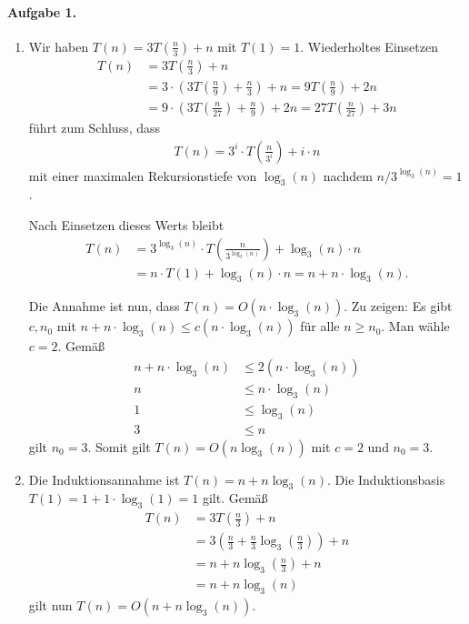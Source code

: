 \documentclass{article}
\begin{document}
\paragraph{Aufgabe 1.}

\begin{enumerate}
    \item Wir haben \(T(n) = 3T(\frac{n}{3}) + n\) mit \(T(1) = 1\). Wiederholtes Einsetzen
    \begin{align*}
        T(n) &= 3 T\left(\frac{n}{3}\right) + n \\
        &= 3 \cdot \left(3T\left(\frac{n}{9}\right) + \frac{n}{3}\right) + n =  9T\left(\frac{n}{9}\right) + 2n \\
        &= 9 \cdot \left(3T\left(\frac{n}{27}\right) + \frac{n}{9}\right) + 2n = 27T\left(\frac{n}{27}\right) + 3n
    \end{align*}
    führt zum Schluss, dass
    \begin{align*}
        T(n) = 3^i \cdot T\left(\frac{n}{3^i}\right) + i \cdot n
    \end{align*}
    mit einer maximalen Rekursionstiefe von \(\log_3(n)\) nachdem \(n / 3^{\log_3(n)} = 1\).

    Nach Einsetzen dieses Werts bleibt
    \begin{align*}
        T(n) &= 3^{\log_3(n)} \cdot T\left(\frac{n}{3^{\log_3(n)}}\right) + \log_3(n) \cdot n \\
        &= n \cdot T(1) + \log_3(n) \cdot n = n + n \cdot \log_3(n).
    \end{align*}

    Die Annahme ist nun, dass \(T(n) = O(n \cdot \log_3(n))\). Zu zeigen: Es gibt \(c, n_0\) mit \(n + n \cdot \log_3(n) \leq c(n \cdot \log_3(n))\) für alle \(n \geq n_0\). Man wähle \(c = 2\). Gemäß
    \begin{align*}
        n + n \cdot \log_3(n) &\leq 2(n \cdot \log_3(n)) \\
        n &\leq n \cdot \log_3(n) \\
        1 &\leq \log_3(n) \\
        3 &\leq n
    \end{align*}
    gilt \(n_0 = 3\). Somit gilt \(T(n) = O(n \log_3(n))\) mit $c = 2$ und $n_0 = 3$.

    \item Die Induktionsannahme ist \(T(n) = n + n\log_3(n)\). Die Induktionsbasis \(T(1) = 1 + 1 \cdot \log_3(1) = 1\) gilt. Gemäß
    \begin{align*}
        T(n) &= 3T\left(\frac{n}{3}\right) + n \\
        &= 3\left(\frac{n}{3} + \frac{n}{3}\log_3\left(\frac{n}{3}\right)\right) + n \\
        &= n + n \log_3\left(\frac{n}{3}\right) + n \\
        &= n + n \log_3(n)
    \end{align*}
    gilt nun $T(n) = O(n + n \log_3(n))$.
\end{enumerate}
\end{document}
